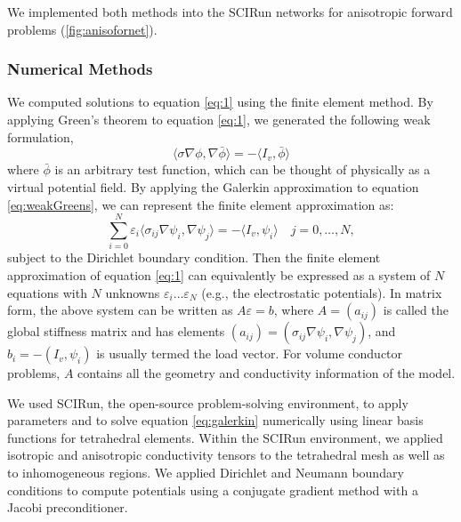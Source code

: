 We implemented both methods into the SCIRun networks for anisotropic forward problems (\ref{fig:anisofornet}). 

\subsubsection{Numerical Methods}
\label{sec:numerical}


We computed solutions to equation \ref{eq:1} using the finite element method. By applying Green's theorem to equation \ref{eq:1}, we generated the following weak formulation,
\begin{equation}
\label{eq:weakGreens}
\langle \sigma \nabla \phi, \nabla \bar{\phi} \rangle = -\langle I_v, \bar{\phi} \rangle
\end{equation}
where $ \bar{\phi}$ is an arbitrary test function, which can be thought of physically as a virtual potential field. By applying the Galerkin approximation to equation \ref{eq:weakGreens}, we can represent the finite element approximation as:
\begin{equation}
\label{eq:galerkin}
\sum_{i = 0}^{N} \varepsilon_i \langle \sigma_{ij} \nabla \psi_{i}, \nabla \psi_{j} \rangle = -\langle I_v, \psi_i \rangle \quad j = 0, \dots, N,
\end{equation}
subject to the Dirichlet boundary condition. Then the finite element approximation of equation \ref{eq:1} can equivalently be expressed as a system of $N$ equations with $N$ unknowns $\varepsilon_i \dots \varepsilon_N$ (e.g., the electrostatic potentials). In matrix form, the above system can be written as $A \varepsilon = b$,  where $A=(a_{ij})$ is called the global stiffness matrix and has elements $(a_{ij}) = (\sigma_{ij} \nabla \psi_{i}, \nabla \psi_{j})$, and $b_i = -(I_v, \psi_i)$ is usually termed the load vector. For volume conductor problems, $A$ contains all the geometry and conductivity information of the model. \cite{SCI:Joh2015c}

We used SCIRun, the open-source problem-solving environment, to apply parameters and to solve equation \ref{eq:galerkin} numerically using linear basis functions for tetrahedral elements. Within the SCIRun environment, we applied isotropic and anisotropic conductivity tensors to the tetrahedral mesh as well as to inhomogeneous regions. We applied Dirichlet and Neumann boundary conditions to compute potentials using a conjugate gradient method with a Jacobi preconditioner.

